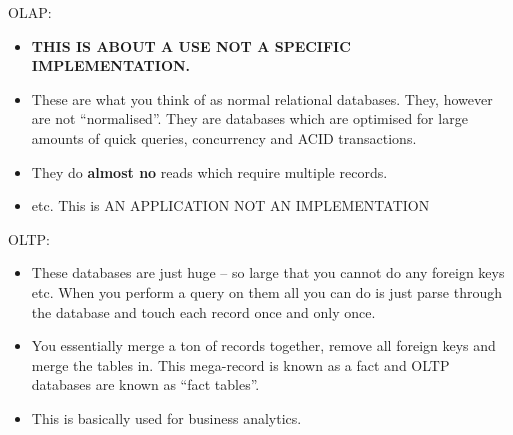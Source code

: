 \documentclass[10pt,\jkfside,a4paper]{article}
\begin{document}
OLAP:
\begin{itemize}
\item \textbf{THIS IS ABOUT A USE NOT A SPECIFIC IMPLEMENTATION.}
\item These are what you think of as normal relational databases.
They, however are not ``normalised''. They are databases which are optimised for large 
amounts of quick queries, concurrency and ACID transactions.
\item They do \textbf{almost no} reads which require multiple records.
\item etc. This is AN APPLICATION NOT AN IMPLEMENTATION
\end{itemize}

OLTP:
\begin{itemize}
\item These databases are just huge -- so large that you cannot do any foreign keys etc. 
When you perform a query on them all you can do is just parse through the database and 
touch each record once and only once.
\item You essentially merge a ton of records together, remove all foreign keys and merge 
the tables in. This mega-record is known as a fact and OLTP databases are known as ``fact 
tables''.
\item This is basically used for business analytics.
\end{itemize}
\end{document}
